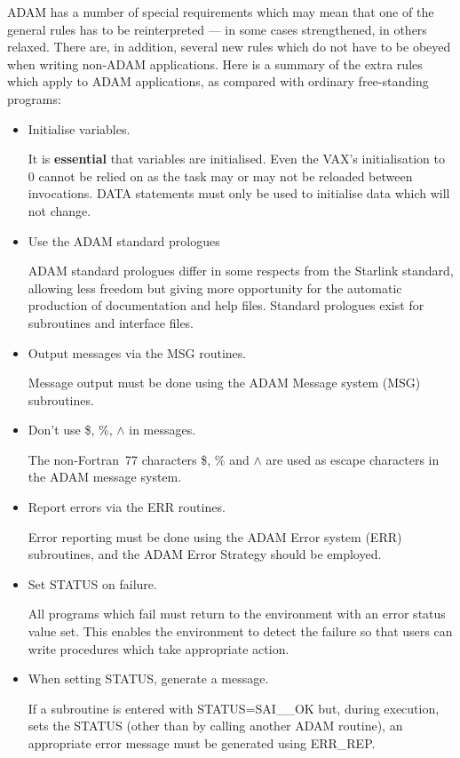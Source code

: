 ADAM has a number of special requirements which may mean that one of the
general rules has to be reinterpreted --- in some cases strengthened, in
others relaxed.
There are, in addition, several new rules which do not have to be obeyed when
writing non-ADAM applications.
Here is a summary of the extra rules which apply to ADAM applications, as
compared with ordinary free-standing programs:

\begin{itemize}
\item Initialise variables.

It is {\bf essential} that variables are initialised.
Even the VAX's initialisation to 0 cannot be relied on as the task may or
may not be reloaded between invocations.
DATA statements must only be used to initialise data which will not change.

\item Use the ADAM standard prologues

ADAM standard prologues differ in some respects from the Starlink
standard, allowing less freedom but giving more opportunity for
the automatic production of documentation and help files.
Standard prologues exist for subroutines and interface files.

\item Output messages via the MSG routines.

Message output must be done using the ADAM Message system (MSG) subroutines.

\item Don't use \$, \%, $\wedge$ in messages.

The non-Fortran~77 characters \$, \% and $\wedge$ are
used as escape characters in the ADAM message system.

\item Report errors via the ERR routines.

Error reporting must be done using the ADAM Error system (ERR) subroutines,
and the ADAM Error Strategy should be employed.

\item Set STATUS on failure.

All programs which fail must return to the
environment with an error status value set.
This enables the environment to detect the failure so that users can write
procedures which take appropriate action.

\item When setting STATUS, generate a message.

If a subroutine is entered with STATUS=SAI\_\_OK
but, during execution, sets the STATUS (other than by calling another ADAM
routine), an appropriate error message must be generated using ERR\_REP.


\end{itemize}
